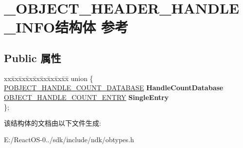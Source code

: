\hypertarget{struct___o_b_j_e_c_t___h_e_a_d_e_r___h_a_n_d_l_e___i_n_f_o}{}\section{\+\_\+\+O\+B\+J\+E\+C\+T\+\_\+\+H\+E\+A\+D\+E\+R\+\_\+\+H\+A\+N\+D\+L\+E\+\_\+\+I\+N\+F\+O结构体 参考}
\label{struct___o_b_j_e_c_t___h_e_a_d_e_r___h_a_n_d_l_e___i_n_f_o}
\subsection*{Public 属性}
\begin{DoxyCompactItemize}
\item 
\mbox{\label{struct___o_b_j_e_c_t___h_e_a_d_e_r___h_a_n_d_l_e___i_n_f_o_a3c7704d20d06a7392c527fae4191594e}} 
\begin{tabbing}
xx\=xx\=xx\=xx\=xx\=xx\=xx\=xx\=xx\=\kill
union \{\\
\>\hyperlink{struct___o_b_j_e_c_t___h_a_n_d_l_e___c_o_u_n_t___d_a_t_a_b_a_s_e}{POBJECT\_HANDLE\_COUNT\_DATABASE} {\bfseries HandleCountDatabase}\\
\>\hyperlink{struct___o_b_j_e_c_t___h_a_n_d_l_e___c_o_u_n_t___e_n_t_r_y}{OBJECT\_HANDLE\_COUNT\_ENTRY} {\bfseries SingleEntry}\\
\}; \\

\end{tabbing}\end{DoxyCompactItemize}


该结构体的文档由以下文件生成\+:\begin{DoxyCompactItemize}
\item 
E\+:/\+React\+O\+S-\/0../sdk/include/ndk/obtypes.\+h\end{DoxyCompactItemize}
